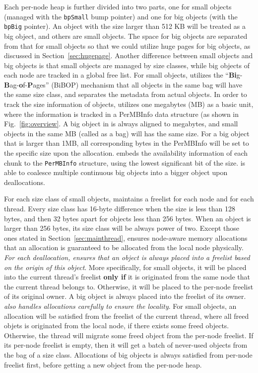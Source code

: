 Each per-node heap is further divided into two parts, one for small objects (managed with the \texttt{bpSmall} bump pointer) and one for big objects (with the \texttt{bpBig} pointer). An object with the size larger than 512 KB will be treated as a big object, and others are small objects. The space for big objects are separated from that for small objects so that we could utilize huge pages for big objects, as discussed in Section~\ref{sec:hugepage}. Another difference between small objects and big objects is that small objects are managed by size classes, while big objects of each node are tracked in a global free list.  For small objects, \NM{} utilizes the ``\textbf{Bi}g-\textbf{B}ag-\textbf{o}f-\textbf{P}ages'' (BiBOP) mechanism that all objects in the same bag will have the same size class, and separates the metadata from actual objects. In order to track the size information of objects, \NM{} utilizes one megabytes (MB) as a basic unit, where the information is tracked in a PerMBInfo data structure (as shown in Fig.~\ref{fig:overview}. A big object in \NM{} is always aligned to megabytes, and small objects in the same MB (called as a bag) will has the same size. For a big object that is larger than 1MB, all corresponding bytes in the PerMBInfo will be set to the specific size upon the allocation. \NM{} embeds the availability information of each chunk to the \texttt{PerMBInfo} structure, using the lowest significant bit of the size. \NM{} is able to coalesce multiple continuous big objects into a bigger object upon deallocations.  

For each size class of small objects, \NM{} maintains a freelist for each node and for each thread. Every size class has 16-byte difference when the size is less than 128 bytes, and then 32 bytes apart for objects less than 256 bytes. When an object is larger than 256 bytes, its size class will be always power of two. Except those ones stated in Section~\ref{sec:mainthread}, \NA{} ensures node-aware memory allocations that an allocation is guaranteed to be allocated from the local node physically. \textit{For each deallocation, \NM{} ensures that an object is always placed into a freelist based on the origin of this object}. More specifically, for small objects, it will be placed into the current thread's freelist \textbf{only if} it is originated from the same node that the current thread belongs to. Otherwise, it will be placed to the per-node freelist of its original owner. A big object is always placed into the freelist of its owner. \textit{\NM{} also handles allocations carefully to ensure the locality}. For small objects, an allocation will be satisfied from the freelist of the current thread, where all freed objets is originated from the local node, if there exists some freed objects. Otherwise, the thread will migrate some freed object from the per-node freelist. If its per-node freelist is empty, then it will get a batch of never-used objects from the bag of a size class. Allocations of big objects is always satisfied from per-node freelist first, before getting a new object from the per-node heap.   


